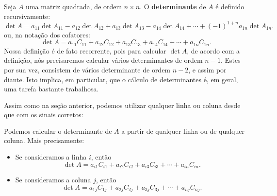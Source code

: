 Seja $A$ uma matriz quadrada, de ordem $n \times n$. O \textbf{determinante} de $A$ é definido recursivamente:
\begin{equation}\label{defdet}
\boxed{\det A = a_{11} \det A_{11} - a_{12} \det A_{12} +  a_{13} \det A_{13} - a_{14} \det A_{14} + \cdots + (-1)^{1+n}  a_{1n} \det A_{1n}.}
\end{equation} ou, na notação dos cofatores:
\begin{equation}
\boxed{\det A = a_{11} C_{11} + a_{12} C_{12} + a_{13} C_{13} + a_{14} C_{14} + \cdots + a_{1n} C_{1n}.}
\end{equation} Nossa definição é de fato recorrente, pois para calcular $\det A$, de acordo com a definição, nós precisaremos calcular vários determinantes de ordem $n-1$. Estes por sua vez, consistem de vários determinante de ordem $n-2$, e assim por diante. Isto implica, em particular, que o cálculo de determinantes é, em geral, uma tarefa bastante trabalhosa.

Assim como na seção anterior, podemos utilizar qualquer linha ou coluna desde que com os sinais corretos:


\begin{teo}
	Podemos calcular o determinante de $A$ a partir de qualquer linha ou de qualquer coluna. Mais precisamente:
	\begin{itemize}
		\item Se consideramos a linha $i$, então
		\begin{equation}
		\det A = a_{i1} C_{i1} + a_{i2} C_{i2} + a_{i3} C_{i3} + \cdots + a_{in} C_{in}.
		\end{equation}
		\item Se consideramos a coluna $j$, então
		\begin{equation}
		\det A = a_{1j} C_{1j} + a_{2j} C_{2j} + a_{3j} C_{3j} + \cdots + a_{nj} C_{nj}.
		\end{equation}
	\end{itemize}
\end{teo}


